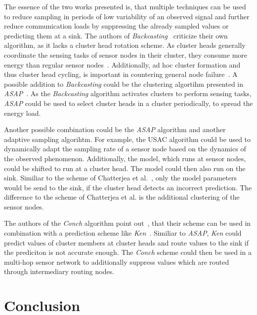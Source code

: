 The essence of the two works presented is, that multiple techniques can be used
to reduce sampling in periods of low variability of an observed signal and
further reduce communication loads by suppressing the already sampled values or
predicting them at a sink. The authors of
\textit{Backcasting}~\cite{willett2004backcasting} criticize their own
algorithm, as it lacks a cluster head rotation scheme. As cluster heads
generally coordinate the sensing tasks of sensor nodes in their cluster, they
consume more energy than regular sensor nodes~\cite{pradhan2016cluster}.
Additionally, ad hoc cluster formation and thus cluster head cycling, is
important in countering general node failure~\cite{hu2018fault}. A possible
addition to \textit{Backcasting} could be the clustering algortihm presented in
\textit{ASAP}~\cite{gedik2007asap}. As the \textit{Backcasting} algorithm
activates clusters to perform sensing tasks, \textit{ASAP} could be used to
select cluster heads in a cluster periodically, to spread the energy load.

Another possible combination could be the \textit{ASAP} algorithm and another
adaptive sampling algorihtm. For example, the \ac{USAC} algorithm could be used
to dynamically adapt the sampling rate of a sensor node based on the dynamics
of the observed phenomenon. Additionally, the model, which runs at sensor
nodes, could be shifted to run at a cluster head. The model could then also run
on the sink. Similiar to the scheme of Chatterjea et
al.~\cite{chatterjea2008adaptive}, only the model parameters would be send to
the sink, if the cluster head detects an incorrect prediction. The difference
to the scheme of Chatterjea et al. is the additional clustering of the sensor
nodes. 

The authors of the \textit{Conch} algorithm point
out~\cite{silberstein2006constraint}, that their scheme can be used in
combination with a prediction scheme like \textit{Ken}~\cite{jain2004adaptive}.
Similiar to \textit{ASAP}, \textit{Ken} could predict values of cluster members
at cluster heads and route values to the sink if the prediciton is not accurate
enough. The \textit{Conch} scheme could then be used in a multi-hop sensor
network to additionally suppress values which are routed through intermediary
routing nodes.

\section{Conclusion}


